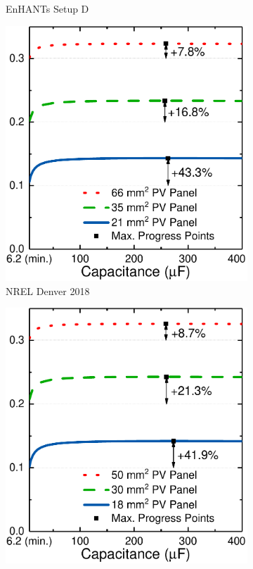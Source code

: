 \begin{figure}
\begin{subfigure}{0.49\columnwidth}
        \caption{EnHANTs Setup D}
        \label{fig:harvstor2}
    \end{subfigure}
    \hfil
    \begin{subfigure}{0.49\columnwidth}
        \centering
        \includegraphics[width=\columnwidth]{ch4_sizingapproach/figures/HarvStorTgFig3}
        \caption{NREL Denver 2018}
        \label{fig:harvstor3}
    \end{subfigure}
    \begin{subfigure}{0.49\columnwidth}
        \centering
        \includegraphics[width=\columnwidth]{ch4_sizingapproach/figures/HarvStorTgFig4}

\end{subfigure}
\end{figure}
